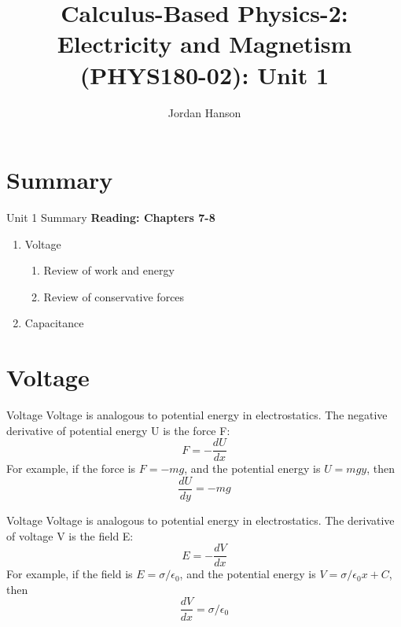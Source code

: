 \documentclass{beamer}
\title{Calculus-Based Physics-2: Electricity and Magnetism (PHYS180-02): Unit 1}
\author{Jordan Hanson}
\institute{Whittier College Department of Physics and Astronomy}
\begin{document}
\maketitle

\section{Summary}

\begin{frame}{Unit 1 Summary}
\textbf{Reading: Chapters 7-8}
\begin{enumerate}
\item Voltage
\begin{enumerate}
\item Review of work and energy
\item Review of conservative forces
\end{enumerate}
\item Capacitance
\end{enumerate}
\end{frame}

\section{Voltage}

\begin{frame}{Voltage}
\alert{Voltage} is analogous to potential energy in electrostatics.  The negative derivative of potential energy U is the force F:
\begin{equation}
F = -\frac{dU}{dx}
\end{equation}
For example, if the force is $F = -mg$, and the potential energy is $U = mgy$, then 
\begin{equation}
\frac{dU}{dy} = -mg
\end{equation}
\end{frame}

\begin{frame}{Voltage}
\alert{Voltage} is analogous to potential energy in electrostatics.  The derivative of voltage V is the field E:
\begin{equation}
E = -\frac{dV}{dx}
\end{equation}
For example, if the field is $E = \sigma/\epsilon_0$, and the potential energy is $V = \sigma/\epsilon_0 x + C$, then 
\begin{equation}
\frac{dV}{dx} = \sigma/\epsilon_0
\end{equation}
\end{frame}
\end{document}
